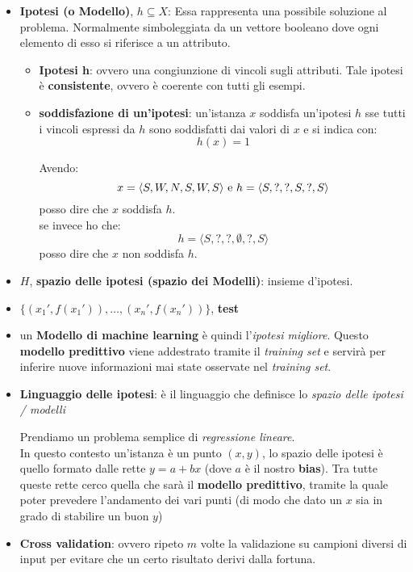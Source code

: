 \begin{shaded}
\begin{itemize}
    \item \textbf{Ipotesi (o Modello)}, $h\subseteq X$: Essa rappresenta una possibile soluzione al problema. Normalmente simboleggiata da un vettore booleano dove ogni elemento di esso si riferisce a un attributo.
    \begin{itemize}
        \item \textbf{Ipotesi h}: ovvero una congiunzione di vincoli sugli
    attributi. Tale ipotesi è \textbf{consistente}, ovvero è coerente con tutti gli esempi.
    \item \textbf{soddisfazione di un'ipotesi}: un'istanza $x$ soddisfa
    un'ipotesi $h$ sse tutti i vincoli espressi da $h$ sono soddisfatti dai
    valori di $x$ e si indica con:
    \[h(x)=1\]
    \begin{esempio}
      Avendo:
      \[x=\langle S,W,N,S,W,S\rangle \mbox{ \textnormal{e}
        }h=\langle S,?,?,S,?,S\rangle\]
      posso dire che $x$ soddisfa $h$.\\
      se invece ho che:
      \[h=\langle S,?,?,\emptyset,?,S\rangle\]
      posso dire che $x$ non soddisfa $h$.
    \end{esempio} 
    \end{itemize}
    
    \item $H$, \textbf{spazio delle ipotesi (spazio dei Modelli)}: insieme d'ipotesi.
    
    
    \item $\{(x_1',f(x_1')),\ldots,(x_n',f(x_n'))\}$, \textbf{test}
    
    
    \item un \textbf{Modello di machine learning} è
    quindi l'\textit{ipotesi migliore}. Questo \textbf{modello predittivo} viene
    addestrato tramite il \textit{training set} e servirà per inferire nuove
    informazioni mai state osservate nel \textit{training set}. 
    
    
    \item \textbf{Linguaggio delle ipotesi}: è il linguaggio che definisce lo
    \textit{spazio delle ipotesi / modelli}
    \begin{esempio}
      Prendiamo un problema semplice di \textit{regressione lineare}.\\
      In questo contesto un'istanza è un punto $(x,y)$, lo spazio delle ipotesi
      è quello formato dalle rette $y=a+bx$ (dove $a$ è il nostro
      \textbf{bias}). Tra tutte queste rette cerco quella che sarà il
      \textbf{modello predittivo}, tramite la quale poter prevedere l'andamento
      dei vari punti (di modo che dato un $x$ sia in grado di stabilire un buon
      $y$)
    \end{esempio}
    
    \item \textbf{Cross validation}: ovvero ripeto $m$ volte la validazione su
    campioni diversi di input per evitare che un certo risultato derivi dalla
    fortuna. 
  \end{itemize}
\end{shaded}



